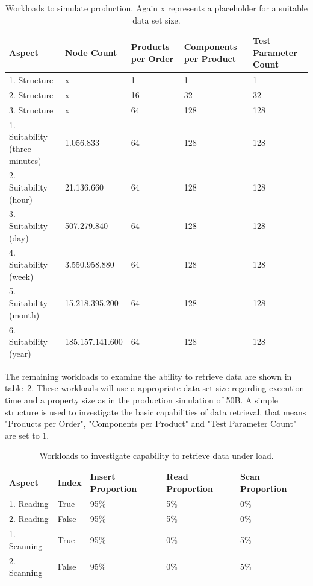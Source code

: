 \begin{table}[!h]
  \begin{minipage}{\textwidth}
    \begin{tabularx}{\textwidth}{ | X | X | X | X | X | }
      \hline
      Aspect & Node Count & Products per Order & Components per Product & Test Parameter Count \\ \hline
      1. Structure & x & 1 & 1 & 1 \\ \hline
      2. Structure & x & 16 & 32 & 32 \\ \hline
      3. Structure & x & 64 & 128 & 128 \\ \hline
      1. Suitability (three minutes) & 1.056.833 & 64 & 128 & 128 \\ \hline
      2. Suitability (hour) & 21.136.660 & 64 & 128 & 128 \\ \hline
      3. Suitability (day) & 507.279.840 & 64 & 128 & 128 \\ \hline
      4. Suitability (week) & 3.550.958.880 & 64 & 128 & 128 \\ \hline
      5. Suitability (month) & 15.218.395.200 & 64 & 128 & 128 \\ \hline
      6. Suitability (year) & 185.157.141.600 & 64 & 128 & 128 \\ \hline
    \end{tabularx}
  \end{minipage}
  \caption{Workloads to simulate production. Again x represents a placeholder for a suitable data set size.}
  \label{tab:productionSimulation}
\end{table}

The remaining workloads to examine the ability to retrieve data are shown in table~\ref{tab:retrievingUnderLoad}.
These workloads will use a appropriate data set size regarding execution time and a property size as in the production simulation of 50B.
A simple structure is used to investigate the basic capabilities of data retrieval,
that means "Products per Order",
"Components per Product" and "Test Parameter Count" are set to $ 1 $.

\begin{table}[!h]
  \begin{minipage}{\textwidth}
    \begin{tabularx}{\textwidth}{ | X | X | X | X | X | }
      \hline
      Aspect & Index & Insert Proportion & Read Proportion & Scan Proportion \\ \hline
      1. Reading & True & 95\% & 5\% & 0\% \\ \hline
      2. Reading & False & 95\% & 5\% & 0\% \\ \hline
      1. Scanning & True & 95\% & 0\% & 5\% \\ \hline
      2. Scanning & False & 95\% & 0\% & 5\% \\ \hline
    \end{tabularx}
  \end{minipage}
  \caption{Workloads to investigate capability to retrieve data under load.}
  \label{tab:retrievingUnderLoad}
\end{table}

